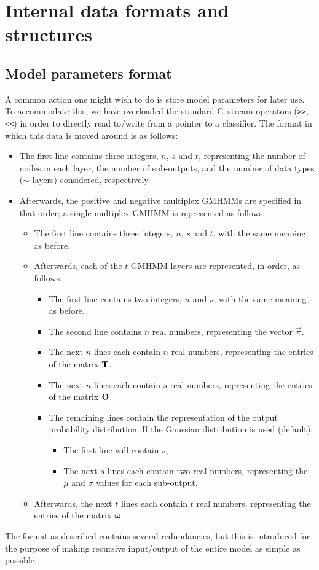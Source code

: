 \documentclass[12pt,openany]{article}
\def\CC{{C\nolinebreak[4]\hspace{-.05em}\raisebox{.4ex}{\tiny\bf ++}}}
\begin{document}
	\section{Internal data formats and structures}\label{sec:format}
	\subsection{Model parameters format}
	A common action one might wish to do is store model parameters for later use. To accommodate this, we have overloaded the standard \CC\ stream operators ({\tt >\/>}, {\tt <\/<}) in order to directly read to/write from a pointer to a classifier. The format in which this data is moved around is as follows:
	\begin{itemize}
		\item The first line contains three integers, $n$, $s$ and $t$, representing the number of nodes in each layer, the number of sub-outputs, and the number of data types ($\sim$ layers) considered, respectively.
		\item Afterwards, the positive and negative multiplex GMHMMs are specified in that order; a single multiplex GMHMM is represented as follows:
		\begin{itemize}
			\item The first line contains three integers, $n$, $s$ and $t$, with the same meaning as before.
			\item Afterwards, each of the $t$ GMHMM layers are represented, in order, as follows:
			\begin{itemize}
				\item The first line contains two integers, $n$ and $s$, with the same meaning as before.
				\item The second line contains $n$ real numbers, representing the vector $\vec{\pi}$.
				\item The next $n$ lines each contain $n$ real numbers, representing the entries of the matrix $\bf T$.
				\item The next $n$ lines each contain $s$ real numbers, representing the entries of the matrix $\bf O$.
				\item The remaining lines contain the representation of the output probability distribution. If the Gaussian distribution is used (default):
					\begin{itemize}
					\item The first line will contain $s$;
					\item The next $s$ lines each contain two real numbers, representing the $\mu$ and $\sigma$ values for each sub-output.
					\end{itemize}
			\end{itemize}
			\item Afterwards, the next $t$ lines each contain $t$ real numbers, representing the entries of the matrix $\boldsymbol\omega$.
		\end{itemize}
	\end{itemize}
	The format as described contains several redundancies, but this is introduced for the purpose of making recursive input/output of the entire model as simple as possible.
\end{document}
